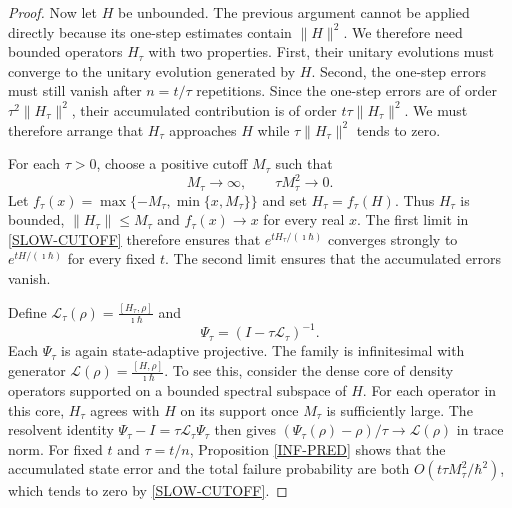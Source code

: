 \documentclass{techbrief}
\begin{document}
\begin{proof}
	Now let $H$ be unbounded. The previous argument cannot be applied directly because its one-step estimates contain $\|H\|^2$. We therefore need bounded operators $H_\tau$ with two properties. First, their unitary evolutions must converge to the unitary evolution generated by $H$. Second, the one-step errors must still vanish after $n=t/\tau$ repetitions. Since the one-step errors are of order $\tau^2\|H_\tau\|^2$, their accumulated contribution is of order $t\tau\|H_\tau\|^2$. We must therefore arrange that $H_\tau$ approaches $H$ while $\tau\|H_\tau\|^2$ tends to zero.

	For each $\tau>0$, choose a positive cutoff $M_\tau$ such that
	\begin{equation}\label{SLOW-CUTOFF}
		M_\tau\longrightarrow\infty,
		\qquad
		\tau M_\tau^2\longrightarrow0.
	\end{equation}
	Let $f_\tau(x)=\max\{-M_\tau,\min\{x,M_\tau\}\}$ and set $H_\tau=f_\tau(H)$. Thus $H_\tau$ is bounded, $\|H_\tau\|\leq M_\tau$ and $f_\tau(x)\to x$ for every real $x$. The first limit in \ref{SLOW-CUTOFF} therefore ensures that $e^{tH_\tau/(\imath\hbar)}$ converges strongly to $e^{tH/(\imath\hbar)}$ for every fixed $t$. The second limit ensures that the accumulated errors vanish.

	Define $\mathcal{L}_\tau(\rho)=\frac{[H_\tau,\rho]}{\imath\hbar}$ and
	\begin{equation}
		\Psi_\tau=(I-\tau\mathcal{L}_\tau)^{-1}.
	\end{equation}
	Each $\Psi_\tau$ is again state-adaptive projective. The family is infinitesimal with generator $\mathcal{L}(\rho)=\frac{[H,\rho]}{\imath\hbar}$. To see this, consider the dense core of density operators supported on a bounded spectral subspace of $H$. For each operator in this core, $H_\tau$ agrees with $H$ on its support once $M_\tau$ is sufficiently large. The resolvent identity $\Psi_\tau-I=\tau\mathcal{L}_\tau\Psi_\tau$ then gives $(\Psi_\tau(\rho)-\rho)/\tau\to\mathcal{L}(\rho)$ in trace norm. For fixed $t$ and $\tau=t/n$, Proposition \ref{INF-PRED} shows that the accumulated state error and the total failure probability are both $O(t\tau M_\tau^2/\hbar^2)$, which tends to zero by \ref{SLOW-CUTOFF}.


\end{proof}
\end{document}
